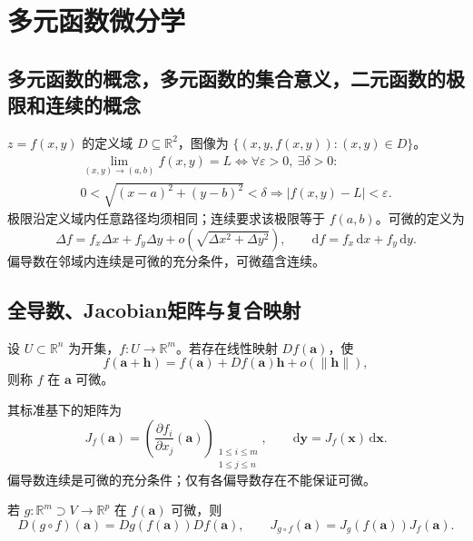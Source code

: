 \documentclass[../main.tex]{subfiles}
\begin{document}
\section{多元函数微分学}
\subsection{多元函数的概念，多元函数的集合意义，二元函数的极限和连续的概念}
$z=f(x,y)$ 的定义域 $D\subseteq\mathbb R^2$，图像为 $\{(x,y,f(x,y)):(x,y)\in D\}$。
\[
\begin{gathered}
\lim_{(x,y)\to(a,b)}f(x,y)=L\iff\forall\varepsilon>0,\ \exists\delta>0:\\
0<\sqrt{(x-a)^2+(y-b)^2}<\delta\Longrightarrow|f(x,y)-L|<\varepsilon.
\end{gathered}
\]
极限沿定义域内任意路径均须相同；连续要求该极限等于 $f(a,b)$。可微的定义为
\[
\Delta f=f_x\Delta x+f_y\Delta y+o\!\left(\sqrt{\Delta x^2+\Delta y^2}\right),\qquad
\mathrm df=f_x\,\mathrm dx+f_y\,\mathrm dy.
\]
偏导数在邻域内连续是可微的充分条件，可微蕴含连续。
\subsection{全导数、Jacobian矩阵与复合映射}
\par\pagebreak[0]\begin{samepage}
设 $U\subset\mathbb R^n$ 为开集，$f:U\to\mathbb R^m$。若存在线性映射 $Df(\bm a)$，使
\[
f(\bm a+\bm h)=f(\bm a)+Df(\bm a)\bm h+o(\|\bm h\|),
\]
则称 $f$ 在 $\bm a$ 可微。
\par\end{samepage}\pagebreak[0]
其标准基下的矩阵为
\[
J_f(\bm a)=\left(\frac{\partial f_i}{\partial x_j}(\bm a)\right)
_{\substack{1\le i\le m\\1\le j\le n}},\qquad
\mathrm d\bm y=J_f(\bm x)\,\mathrm d\bm x.
\]
偏导数连续是可微的充分条件；仅有各偏导数存在不能保证可微。
\par\pagebreak[0]\begin{samepage}
若 $g:\mathbb R^m\supset V\to\mathbb R^p$ 在 $f(\bm a)$ 可微，则
\[
D(g\circ f)(\bm a)=Dg(f(\bm a))Df(\bm a),\qquad
J_{g\circ f}(\bm a)=J_g(f(\bm a))J_f(\bm a).
\]
\par\end{samepage}\pagebreak[0]
\end{document}
